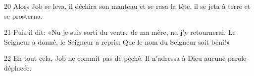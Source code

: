 
20 Alors Job se leva, il déchira son manteau et se rasa la tête, il se jeta à terre et se prosterna.

21 Puis il dit: «Nu je suis sorti du ventre de ma mère, nu j’y retournerai. Le Seigneur a donné, le Seigneur a repris: Que le nom du Seigneur soit béni!»

22 En tout cela, Job ne commit pas de péché. Il n’adressa à Dieu aucune parole déplacée.